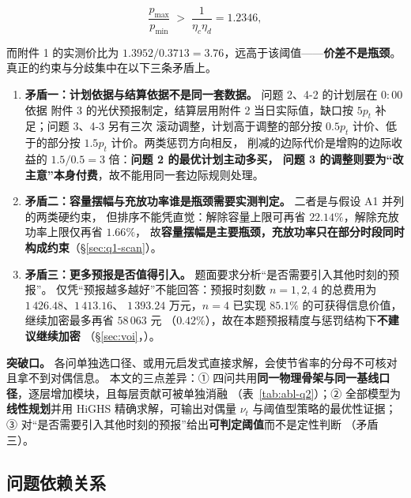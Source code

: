 \begin{equation}
  \frac{p_{\max}}{p_{\min}}\;>\;\frac{1}{\eta_c\eta_d}=1.2346 ,
  \label{eq:ch1-arb}
\end{equation}

而附件 1 的实测价比为 \(1.3952/0.3713=3.76\)，远高于该阈值——\textbf{价差不是瓶颈}。
真正的约束与分歧集中在以下三条矛盾上。

\begin{enumerate}
  \item \textbf{矛盾一：计划依据与结算依据不是同一套数据。} 问题 2、4-2 的计划层在 \(0{:}00\) 依据
    附件 3 的光伏预报制定，结算层用附件 2 当日实际值，缺口按 \(5p_t\) 补足；问题 3、4-3 另有三次
    滚动调整，计划高于调整的部分按 \(0.5p_t\) 计价、低于的部分按 \(1.5p_t\) 计价。两类惩罚方向相反，
    削减的边际代价是增购的边际收益的 \(1.5/0.5=3\) 倍：\textbf{问题 2 的最优计划主动多买，
    问题 3 的调整则要为“改主意”本身付费}，故不能用同一套边际规则处理。
  \item \textbf{矛盾二：容量摆幅与充放功率谁是瓶颈需要实测判定。} 二者是与假设 A1 并列的两类硬约束，
    但排序不能凭直觉：解除容量上限可再省 \(22.14\%\)，解除充放功率上限仅再省 \(1.66\%\)，
    故\textbf{容量摆幅是主要瓶颈，充放功率只在部分时段同时构成约束}（\S\ref{sec:q1-scan}）。
  \item \textbf{矛盾三：更多预报是否值得引入。} 题面要求分析“是否需要引入其他时刻的预报”。
    仅凭“预报越多越好”不能回答：预报时刻数 \(n=1,2,4\) 的总费用为 \(1\,426.48\)、\(1\,413.16\)、
    \(1\,393.24\) 万元，\(n=4\) 已实现 \(85.1\%\) 的可获得信息价值，继续加密最多再省 \(58\,063\) 元
    （\(0.42\%\)），故在本题预报精度与惩罚结构下\textbf{不建议继续加密}
    （\S\ref{sec:voi}，）。
\end{enumerate}

\textbf{突破口。} 各问单独选口径、或用元启发式直接求解，会使节省率的分母不可核对且拿不到对偶信息。
本文的三点差异：① 四问共用\textbf{同一物理骨架与同一基线口径}，逐层增加模块，且每层贡献可被单独消融
（表~\ref{tab:abl-q2}）；② 全部模型为\textbf{线性规划}并用 HiGHS 精确求解，可输出对偶量 \(\nu_t\)
与阈值型策略的最优性证据；③ 对“是否需要引入其他时刻的预报”给出\textbf{可判定阈值}而不是定性判断
（矛盾三）。

\subsection{问题依赖关系}\label{sec:analysis-depend}


